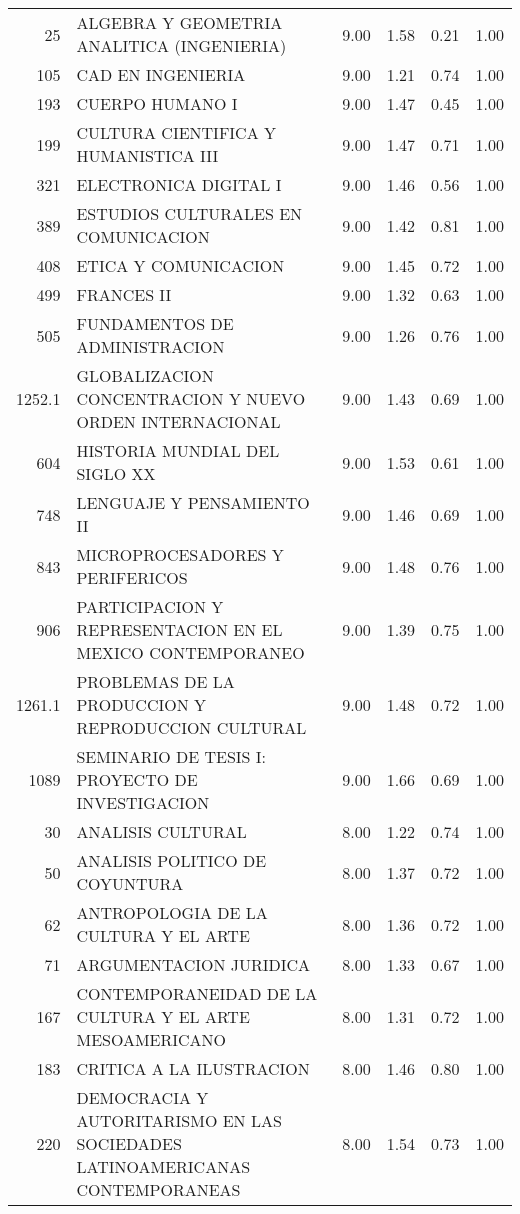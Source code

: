 \begin{table}[ht]
\begin{tabular}{rlrrrr}
  25 & ALGEBRA Y GEOMETRIA ANALITICA (INGENIERIA) & 9.00 & 1.58 & 0.21 & 1.00 \\ 
  105 & CAD EN INGENIERIA & 9.00 & 1.21 & 0.74 & 1.00 \\ 
  193 & CUERPO HUMANO I & 9.00 & 1.47 & 0.45 & 1.00 \\ 
  199 & CULTURA CIENTIFICA Y HUMANISTICA III & 9.00 & 1.47 & 0.71 & 1.00 \\ 
  321 & ELECTRONICA DIGITAL I & 9.00 & 1.46 & 0.56 & 1.00 \\ 
  389 & ESTUDIOS CULTURALES EN COMUNICACION & 9.00 & 1.42 & 0.81 & 1.00 \\ 
  408 & ETICA Y COMUNICACION & 9.00 & 1.45 & 0.72 & 1.00 \\ 
  499 & FRANCES II & 9.00 & 1.32 & 0.63 & 1.00 \\ 
  505 & FUNDAMENTOS DE ADMINISTRACION & 9.00 & 1.26 & 0.76 & 1.00 \\ 
  1252.1 & GLOBALIZACION CONCENTRACION Y NUEVO ORDEN INTERNACIONAL & 9.00 & 1.43 & 0.69 & 1.00 \\ 
  604 & HISTORIA MUNDIAL DEL SIGLO XX & 9.00 & 1.53 & 0.61 & 1.00 \\ 
  748 & LENGUAJE Y PENSAMIENTO II & 9.00 & 1.46 & 0.69 & 1.00 \\ 
  843 & MICROPROCESADORES Y PERIFERICOS & 9.00 & 1.48 & 0.76 & 1.00 \\ 
  906 & PARTICIPACION Y REPRESENTACION EN EL MEXICO CONTEMPORANEO & 9.00 & 1.39 & 0.75 & 1.00 \\ 
  1261.1 & PROBLEMAS DE LA PRODUCCION Y REPRODUCCION CULTURAL & 9.00 & 1.48 & 0.72 & 1.00 \\ 
  1089 & SEMINARIO DE TESIS I: PROYECTO DE INVESTIGACION & 9.00 & 1.66 & 0.69 & 1.00 \\ 
  30 & ANALISIS CULTURAL & 8.00 & 1.22 & 0.74 & 1.00 \\ 
  50 & ANALISIS POLITICO DE COYUNTURA & 8.00 & 1.37 & 0.72 & 1.00 \\ 
  62 & ANTROPOLOGIA DE LA CULTURA Y EL ARTE & 8.00 & 1.36 & 0.72 & 1.00 \\ 
  71 & ARGUMENTACION JURIDICA & 8.00 & 1.33 & 0.67 & 1.00 \\ 
  167 & CONTEMPORANEIDAD DE LA CULTURA Y EL ARTE MESOAMERICANO & 8.00 & 1.31 & 0.72 & 1.00 \\ 
  183 & CRITICA A LA ILUSTRACION & 8.00 & 1.46 & 0.80 & 1.00 \\ 
  220 & DEMOCRACIA Y AUTORITARISMO EN LAS SOCIEDADES LATINOAMERICANAS CONTEMPORANEAS & 8.00 & 1.54 & 0.73 & 1.00 \\ 

\end{tabular}
\end{table}

